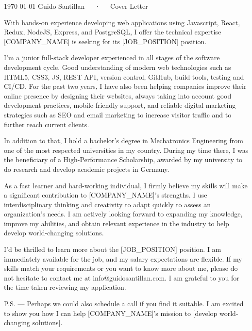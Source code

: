 \documentclass[11pt, a4paper]{awesome-cv}
\begin{document}
\makecvheader[C]

\makecvfooter
  {\today}
  {Guido Santillan~~~·~~~Cover Letter}
  {}

\makelettertitle

\begin{cvletter}

  With hands-on experience developing web applications using Javascript, React, Redux, NodeJS, Express, and PostgreSQL, I offer the technical expertise [COMPANY_NAME] is seeking for its [JOB_POSITION] position.

I'm a junior full-stack developer experienced in all stages of the software development cycle. Good understanding of modern web technologies such as HTML5, CSS3, JS, REST API, version control, GitHub, build tools, testing and CI/CD. For the past two years, I have also been helping companies improve their online presence by designing their websites, always taking into account good development practices, mobile-friendly support, and reliable digital marketing strategies such as SEO and email marketing to increase visitor traffic and to further reach current clients.

In addition to that, I hold a bachelor's degree in Mechatronics Engineering from one of the most respected universities in my country. During my time there, I was the beneficiary of a High-Performance Scholarship, awarded by my university to do research and develop academic projects in Germany.

As a fast learner and hard-working individual, I firmly believe my skills will make a significant contribution to [COMPANY_NAME]'s strengths. I use interdisciplinary thinking and creativity to adapt quickly to assess an organization's needs. I am actively looking forward to expanding my knowledge, improve my abilities, and obtain relevant experience in the industry to help develop world-changing solutions.

I'd be thrilled to learn more about the [JOB_POSITION] position. I am immediately available for the job, and my salary expectations are flexible. If my skills match your requirements or you want to know more about me, please do not hesitate to contact me at info@guidosantillan.com. I am grateful to you for the time taken reviewing my application.

\end{cvletter}

\makeletterclosing

P.S. — Perhaps we could also schedule a call if you find it suitable. I am excited to show you how I can help [COMPANY_NAME]'s mission to [develop world-changing solutions].
\end{document}
